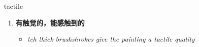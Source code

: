 
\begin{frame}
{\huge tactile}
\begin{center}
\begin{enumerate}\Large
  \item \textbf{有触觉的，能感触到的}
  \begin{itemize}
    \item \em{\Large{teh thick brushshrokes give the painting a tactile quality}}
  \end{itemize}
\end{enumerate}
\end{center}
\end{frame}
